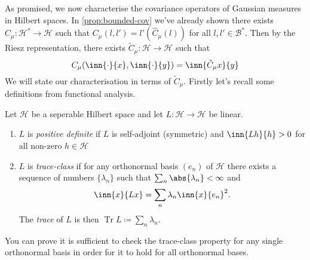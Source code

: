 \documentclass[fontsize=12pt, DIV=10]{scrreprt}
\theoremstyle{remark}
\newcommand{\defeq}{\coloneqq}
\newcommand{\calB}{\mathcal B}
\newcommand{\calH}{\mathcal H}
\DeclareMathOperator{\tr}{Tr}
\begin{document}
As promised, we now characterise the covariance operators of Gaussian measures in Hilbert spaces. In \vref{prop:bounded-cov} we've already shown there exists $\hat{C}_{\mu}: \calH^* \to \calH$ such that $C_{\mu}(l, l') = l'(\hat{C}_{\mu}(l))$ for all $l, l' \in \calB^*$. Then by the Riesz representation, there exists $\tilde{C}_{\mu}: \calH \to \calH$ such that
\begin{equation}
	C_{\mu}(\inn{\cdot}{x}, \inn{\cdot}{y}) = \inn{\tilde{C}_{\mu}x}{y}
\end{equation}
We will state our characterisation in terms of $\tilde{C}_{\mu}$. Firstly let's recall some definitions from functional analysis.
\begin{defn}
	Let $\calH$ be a seperable Hilbert space and let $L: \calH \to \calH$ be linear.
	\begin{enumerate}
		\item $L$ is \emph{positive definite} if $L$ is self-adjoint (symmetric) and $\inn{L h}{h} > 0$ for all non-zero $h \in \calH$
		\item $L$ is \emph{trace-class} if for any orthonormal basis $(e_n)$ of $\calH$ there exists a sequence of numbers $\{\lambda_n\}$ such that $\sum_n \abs{\lambda_n} < \infty$ and
			\begin{equation}
				\inn{x}{Lx} = \sum_n \lambda_n \inn{x}{e_n}^2.
			\end{equation}
			The \emph{trace} of $L$ is then $\tr L \defeq \sum_n \lambda _n$.
	\end{enumerate}
\end{defn}
You can prove it is sufficient to check the trace-class property for any single orthonormal basis in order for it to hold for all orthonormal bases.
\end{document}
